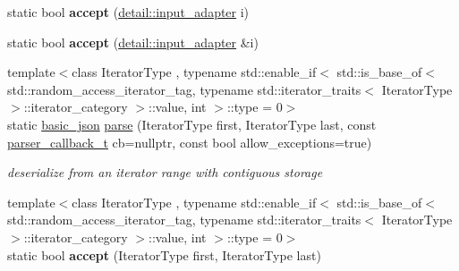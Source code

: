 \begin{DoxyCompactItemize}
\mbox{\label{classnlohmann_1_1basic__json_a776868dd5f9892564c1f6c786d1f80a3}} 
static bool {\bfseries accept} (\mbox{\hyperlink{classnlohmann_1_1detail_1_1input__adapter}{detail\+::input\+\_\+adapter}} i)
\item 
\mbox{\label{classnlohmann_1_1basic__json_a2c3a529fba80aa83557246b910181388}} 
static bool {\bfseries accept} (\mbox{\hyperlink{classnlohmann_1_1detail_1_1input__adapter}{detail\+::input\+\_\+adapter}} \&i)
\item 
{\footnotesize template$<$class Iterator\+Type , typename std\+::enable\+\_\+if$<$ std\+::is\+\_\+base\+\_\+of$<$ std\+::random\+\_\+access\+\_\+iterator\+\_\+tag, typename std\+::iterator\+\_\+traits$<$ Iterator\+Type $>$\+::iterator\+\_\+category $>$\+::value, int $>$\+::type  = 0$>$ }\\static \mbox{\hyperlink{classnlohmann_1_1basic__json}{basic\+\_\+json}} \mbox{\hyperlink{classnlohmann_1_1basic__json_ab330c13ba254ea41fbc1c52c5c610f45}{parse}} (Iterator\+Type first, Iterator\+Type last, const \mbox{\hyperlink{classnlohmann_1_1basic__json_ab4f78c5f9fd25172eeec84482e03f5b7}{parser\+\_\+callback\+\_\+t}} cb=nullptr, const bool allow\+\_\+exceptions=true)
\begin{DoxyCompactList}\small\item\em deserialize from an iterator range with contiguous storage \end{DoxyCompactList}\item 
\mbox{\label{classnlohmann_1_1basic__json_ae797958b922732bf5fc01053d0659c1f}} 
{\footnotesize template$<$class Iterator\+Type , typename std\+::enable\+\_\+if$<$ std\+::is\+\_\+base\+\_\+of$<$ std\+::random\+\_\+access\+\_\+iterator\+\_\+tag, typename std\+::iterator\+\_\+traits$<$ Iterator\+Type $>$\+::iterator\+\_\+category $>$\+::value, int $>$\+::type  = 0$>$ }\\static bool {\bfseries accept} (Iterator\+Type first, Iterator\+Type last)
\end{DoxyCompactItemize}
